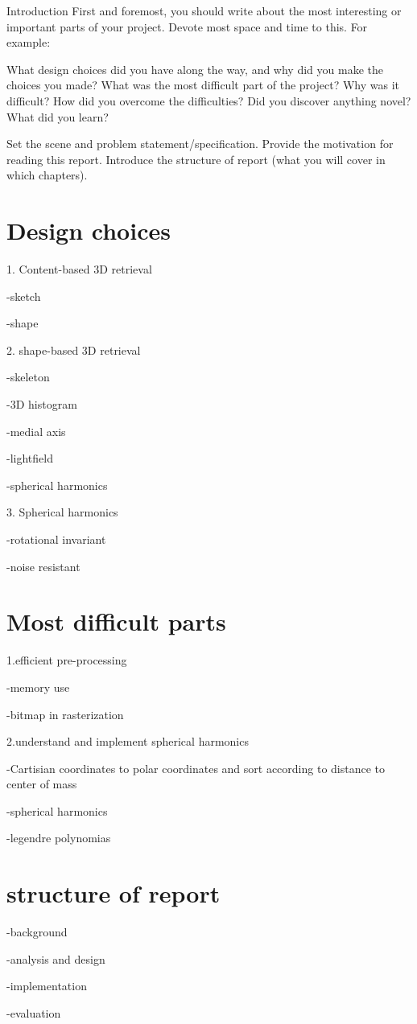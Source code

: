 
Introduction
First and foremost, you should write about the most interesting or important parts of your project. Devote most space and time to this. For example:

 

    What design choices did you have along the way, and why did you make the choices you made?
    What was the most difficult part of the project?
    Why was it difficult?
    How did you overcome the difficulties?
    Did you discover anything novel?
    What did you learn?


Set the scene and problem statement/specification. Provide the motivation for reading this report. Introduce the structure of report (what you will cover in which chapters). 

\section{Design choices}
1. Content-based 3D retrieval

-sketch

-shape


2. shape-based 3D retrieval

-skeleton

-3D histogram

-medial axis

-lightfield

-spherical harmonics


3. Spherical harmonics

-rotational invariant

-noise resistant



\section{Most difficult parts}

1.efficient pre-processing

-memory use

-bitmap in rasterization


2.understand and implement spherical harmonics

-Cartisian coordinates to polar coordinates and sort according to distance to center of mass

-spherical harmonics

-legendre polynomias


\section{structure of report}

-background

-analysis and design

-implementation

-evaluation


